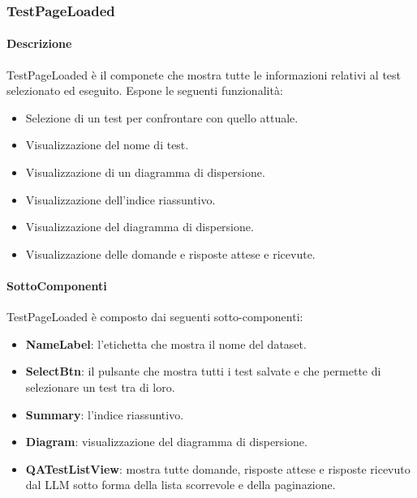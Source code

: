 \subsubsection{TestPageLoaded}
\label{sec:TestPageLoaded}
\paragraph{Descrizione}
TestPageLoaded è il componete che mostra tutte le informazioni relativi al test selezionato ed eseguito. Espone le seguenti funzionalità:
\begin{itemize}
    \item Selezione di un test per confrontare con quello attuale.
    \item Visualizzazione del nome di test.
    \item Visualizzazione di un diagramma di dispersione.
    \item Visualizzazione dell'indice riassuntivo.
    \item Visualizzazione del diagramma di dispersione.
    \item Visualizzazione delle domande e risposte attese e ricevute.
\end{itemize}
\paragraph{SottoComponenti}
TestPageLoaded è composto dai seguenti sotto-componenti:
\begin{itemize}
    \item \textbf{NameLabel}: l'etichetta che mostra il nome del dataset.
    \item \textbf{SelectBtn}: il pulsante che mostra tutti i test salvate e che permette di selezionare un test tra di loro.
    \item \textbf{Summary}: l'indice riassuntivo.
    \item \textbf{Diagram}: visualizzazione del diagramma di dispersione.
    \item \textbf{QATestListView}: mostra tutte domande, risposte attese e risposte ricevuto dal LLM sotto forma della lista scorrevole e della paginazione.
\end{itemize}

